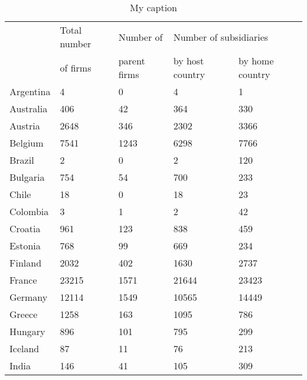 \begin{table}[]
\centering
\caption{My caption}
\label{my-label}
\begin{tabular}{lllll}
            & Total number & Number of    & \multicolumn{2}{l}{Number of subsidiaries} \\
            & of firms     & parent firms & by host country      & by home country     \\
Argentina   & 4            & 0            & 4                    & 1                   \\
Australia   & 406          & 42           & 364                  & 330                 \\
Austria     & 2648         & 346          & 2302                 & 3366                \\
Belgium     & 7541         & 1243         & 6298                 & 7766                \\
Brazil      & 2            & 0            & 2                    & 120                 \\
Bulgaria    & 754          & 54           & 700                  & 233                 \\
Chile       & 18           & 0            & 18                   & 23                  \\
Colombia    & 3            & 1            & 2                    & 42                  \\
Croatia     & 961          & 123          & 838                  & 459                 \\
Estonia     & 768          & 99           & 669                  & 234                 \\
Finland     & 2032         & 402          & 1630                 & 2737                \\
France      & 23215        & 1571         & 21644                & 23423               \\
Germany     & 12114        & 1549         & 10565                & 14449               \\
Greece      & 1258         & 163          & 1095                 & 786                 \\
Hungary     & 896          & 101          & 795                  & 299                 \\
Iceland     & 87           & 11           & 76                   & 213                 \\
India       & 146          & 41           & 105                  & 309                 \\

\end{tabular}
\end{table}
